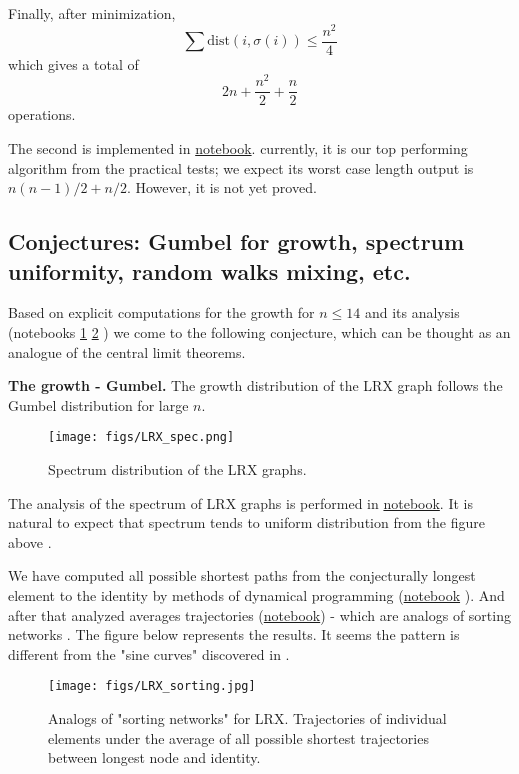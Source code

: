 \documentclass[atmp]{ipart_v1}
\numberwithin{equation}{section}
\theoremstyle{plain}%
\begin{document}
Finally, after minimization,
\[
\sum \text{dist}(i, \sigma(i)) \leq \frac{n^2}{4}
\]
which gives a total of  
\[
2n + \frac{n^2}{2} + \frac{n}{2}
\]
operations.




The second is implemented in \href{https://www.kaggle.com/code/luxoove/top1-lrx-inversions-based-algorithm}{notebook}. currently, it is our top performing algorithm from the practical tests; we expect its worst case length output is $n(n-1)/2+n/2$. However, it is not yet proved.


\subsection{Conjectures: Gumbel for growth, spectrum uniformity, random walks mixing, etc. }

Based on explicit computations for the growth for $n \le 14$ and its analysis (notebooks \href{https://www.kaggle.com/code/ogurtsov/gumbel}{1} \href{https://www.kaggle.com/code/ogurtsov/gumbel-for-binary-puzzle}{2} ) we come to the following conjecture, which can be thought as an analogue of the central limit theorems. 

{\bf The growth - Gumbel.} The growth distribution of the LRX graph follows the Gumbel distribution for large $n$.

\begin{figure}[h!]
 \centering
 \texttt{[image: figs/LRX\_spec.png]}
 \caption{Spectrum distribution of the LRX graphs. }\label{fig:LRX-spec}
\end{figure}

The analysis of the spectrum of LRX graphs is performed in \href{https://www.kaggle.com/code/nikolenkosergei/spectrum-analysis}{notebook}. It is natural to expect that spectrum tends to uniform distribution from the figure above .

We have computed all possible shortest paths from the conjecturally longest element to the identity by methods of dynamical programming (\href{}{notebook} ). And after that analyzed averages trajectories (\href{https://www.kaggle.com/code/antoninadolgorukova/lrx-sorting-networks}{notebook}) - which are analogs of sorting networks \cite{angel2007random}. The figure below represents the results. It seems the pattern is different from the "sine curves" discovered in \cite{angel2007random}. 

\begin{figure}[h!]
 \centering
 \texttt{[image: figs/LRX\_sorting.jpg]}
 \caption{Analogs of "sorting networks" for LRX. Trajectories of individual elements under the average of all possible shortest trajectories between longest node and identity. }\label{fig:LRX-sort}
\end{figure}
\end{document}
